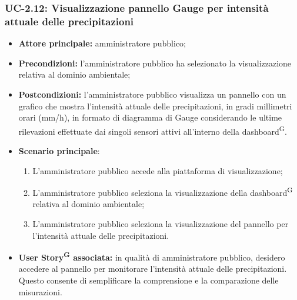 \documentclass[8pt]{article}
\newcommand{\glossterm}[1]{#1\textsuperscript{G}} %
\begin{document}
\subsubsection*{UC-2.12: Visualizzazione pannello Gauge per intensità attuale delle precipitazioni}
\begin{itemize}
    \item \textbf{Attore principale:} amministratore pubblico;
    \item \textbf{Precondizioni:} l'amministratore pubblico ha selezionato la visualizzazione
        relativa al dominio ambientale;
    \item \textbf{Postcondizioni:} l'amministratore pubblico visualizza un pannello con un grafico che mostra l'intensità attuale delle precipitazioni, in gradi millimetri orari (mm/h), in formato di diagramma di Gauge considerando le ultime rilevazioni effettuate dai singoli sensori attivi all'interno della \glossterm{dashboard}.
    \item \textbf{Scenario principale}:
    \begin{enumerate}
    \item L'amministratore pubblico accede alla piattaforma di visualizzazione;
    \item L'amministratore pubblico seleziona la visualizzazione della \glossterm{dashboard} relativa al dominio
        ambientale; 
    \item L'amministratore pubblico seleziona la visualizzazione del pannello per l'intensità attuale delle precipitazioni.
    \end{enumerate}
\item \textbf{\glossterm{User Story} associata:} in qualità di amministratore pubblico, desidero accedere al pannello per monitorare l'intensità attuale delle precipitazioni. Questo consente di semplificare la comprensione e la comparazione delle misurazioni.
\end{itemize}
\end{document}
